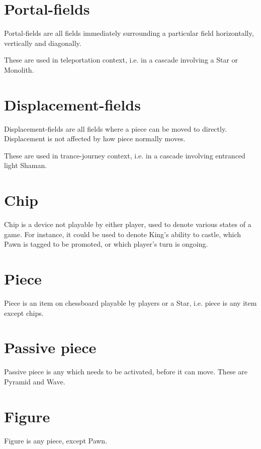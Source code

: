 \section*{Portal-fields}
\label{sec:Terms/Portal-fields}
Portal-fields are all fields immediately surrounding a particular field horizontally,
vertically and diagonally.

These are used in teleportation context, i.e. in a cascade involving a Star or Monolith.

\section*{Displacement-fields}
\label{sec:Terms/Displacement-fields}
Displacement-fields are all fields where a piece can be moved to directly.
Displacement is not affected by how piece normally moves.

These are used in trance-journey context, i.e. in a cascade involving entranced light Shaman.

\section*{Chip}
\label{sec:Terms/Chip}
Chip is a device not playable by either player, used to denote various states
of a game. For instance, it could be used to denote King's ability to castle,
which Pawn is tagged to be promoted, or which player's turn is ongoing.

\section*{Piece}
\label{sec:Terms/Piece}
Piece is an item on chessboard playable by players or a Star, i.e. piece is
any item except chips.

\section*{Passive piece}
\label{sec:Terms/Passive piece}
Passive piece is any which needs to be activated, before it can move.
These are Pyramid and Wave.

\section*{Figure}
\label{sec:Terms/Figure}
Figure is any piece, except Pawn.

